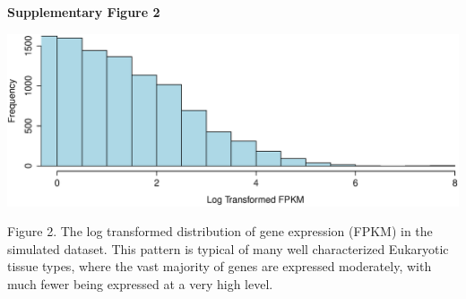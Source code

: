 \documentclass[11pt]{article}
\begin{document}
\vspace{50mm}
\textbf{\hypertarget{Supplementary Figure 2}{Supplementary  Figure 2}} \\
\centerline{\includegraphics[width=30.0\baselineskip]{newfig2.eps}}
\begin{changemargin}{2cm}{2cm} 
Figure 2.  The log transformed distribution of gene expression (FPKM) in the simulated dataset. This pattern is typical of many well characterized Eukaryotic tissue types, where the vast majority of genes are expressed moderately, with much fewer being expressed at a very high level. 
\end{changemargin}
\vspace{10mm}
\end{document}
